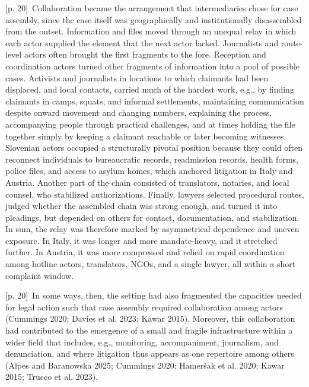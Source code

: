 \documentclass[10pt,a4paper]{article}
\begin{document}
{\scriptsize\color{gray} [p. 20]}\ Collaboration became the arrangement that intermediaries chose for case assembly, since the case itself was geographically and institutionally disassembled from the outset. Information and files moved through an unequal relay in which each actor supplied the element that the next actor lacked. Journalists and route-level actors often brought the first fragments to the fore. Reception and coordination actors turned other fragments of information into a pool of possible cases. Activists and journalists in locations to which claimants had been displaced, and local contacts, carried much of the hardest work, e.g., by finding claimants in camps, squats, and informal settlements, maintaining communication despite onward movement and changing numbers, explaining the process, accompanying people through practical challenges, and at times holding the file together simply by keeping a claimant reachable or later becoming witnesses. Slovenian actors occupied a structurally pivotal position because they could often reconnect individuals to bureaucratic records, readmission records, health forms, police files, and access to asylum homes, which anchored litigation in Italy and Austria. Another part of the chain consisted of translators, notaries, and local counsel, who stabilized authorizations. Finally, lawyers selected procedural routes, judged whether the assembled chain was strong enough, and turned it into pleadings, but depended on others for contact, documentation, and stabilization. In sum, the relay was therefore marked by asymmetrical dependence and uneven exposure. In Italy, it was longer and more mandate-heavy, and it stretched further. In Austria, it was more compressed and relied on rapid coordination among hotline actors, translators, NGOs, and a single lawyer, all within a short complaint window.\par
{\scriptsize\color{gray} [p. 20]}\ In some ways, then, the setting had also fragmented the capacities needed for legal action such that case assembly required collaboration among actors (Cummings 2020; Davies et al. 2023; Kawar 2015). Moreover, this collaboration had contributed to the emergence of a small and fragile infrastructure within a wider field that includes, e.g., monitoring, accompaniment, journalism, and denunciation, and where litigation thus appears as one repertoire among others (Alpes and Baranowska 2025; Cummings 2020; Hameršak et al. 2020; Kawar 2015; Trucco et al. 2023).\par
\end{document}
